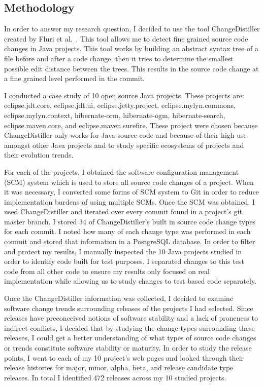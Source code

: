 \subsection{Methodology}
\label{sec:apie-meth}
In order to answer my research question, I decided to use the tool ChangeDistiller created by Fluri et al.~\cite{Fluri:2007:CDT}. This tool allows me to detect fine grained
source code changes in Java projects. This tool works by building an abstract syntax tree of a file before and after a code change, then it tries to determine
the smallest possible edit distance between the trees. This results in the source code change at a fine grained level performed in the commit.

I conducted a case study of 10 open source Java projects. These projects are: eclipse.jdt.core, eclipse.jdt.ui, eclipse.jetty.project, 
eclipse.mylyn.commons, eclipse.mylyn.context, hibernate-orm, hibernate-ogm, hibernate-search, eclipse.maven.core, and eclipse.maven.surefire. These project were chosen
because ChangeDistiller only works for Java source code and because of their high use amongst other Java projects and to study specific ecosystems 
of projects and their evolution trends.

For each of the projects, I obtained the software configuration management (SCM) system
which is used to store all source code changes of a project. When it was necessary, I converted some forms of SCM system to Git in order to reduce implementation
burdens of using multiple SCMs. Once the SCM was obtained, I used ChangeDistiller and iterated over every commit found in a project's git master branch. I stored
34 of ChangeDistiller's built in source code change types for each commit. I noted how many of each change type was performed in each commit and stored that information
in a PostgreSQL database. In order to filter and protect my results, I manually inspected the 10 Java projects studied in order to identify code built for test
purposes.
I separated changes to this test code from all other code to ensure my results only focused on real implementation while allowing us to study changes to
test based code separately.

Once the ChangeDistiller information was collected, I decided to examine software change trends surrounding releases of the projects I had selected. Since releases
have preconceived notions of software stability and a lack of proneness to indirect conflicts, 
I decided that by studying the change types surrounding these releases, I could get a better understanding of
what types of source code changes or trends constitute software stability or maturity. In order to study the release points, I went to each of my 10 project's 
web pages and looked through their release histories for major, minor, alpha, beta, and release candidate type releases. In total I identified 472 releases
across my 10 studied projects.  

